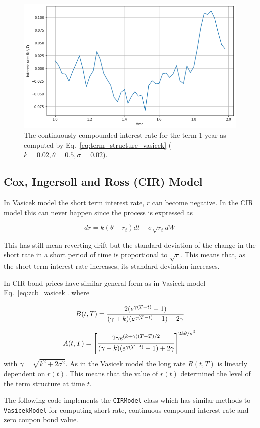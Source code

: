 \begin{figure}[htb]
	\centering
	\includegraphics[width=0.7\linewidth]{figures/vasicek_interest_rate}
	\caption{The continuously compounded interest rate for the term 1 year as computed by Eq.~\ref{eq:term_structure_vasicek} ($k=0.02, \theta=0.5, \sigma=0.02$).}
	\label{fig:term_structure_vasicek}
\end{figure}

\subsection{Cox, Ingersoll and Ross (CIR) Model}
\label{cox-ingersoll-and-ross-cir-model}

In Vasicek model the short term interest rate, \(r\) can become
negative. In the CIR model this can never happen since the process is
expressed as

\[dr = k(\theta - r_t)dt + \sigma\sqrt{r_t}dW\]

This has still mean reverting drift but the standard deviation of the
change in the short rate in a short period of time is proportional to
\(\sqrt{r}\). This means that, as the short-term interest rate
increases, its standard deviation increases.

In CIR bond prices have similar general form as in Vasicek model
Eq.~\ref{eq:zcb_vasicek}. where

\[B(t, T) = \cfrac{2(e^{\gamma(T-t)}-1)}{(\gamma+k)(e^{\gamma(T-t)}-1)+2\gamma}\]

\[A(t, T) = \left[\cfrac{2\gamma e^{(k+\gamma)(T-T)/2}}{(\gamma+k)(e^{\gamma(T-t)}-1)+2\gamma}\right]^{2k\theta /\sigma^2}\]
with \(\gamma = \sqrt {k^2 + 2\sigma^2}\). As in the Vasicek model the
long rate \(R(t, T)\) is linearly dependent on \(r(t)\). This means that
the value of \(r(t)\) determined the level of the term structure at time
\(t\).

The following code implements the \texttt{CIRModel} class which 
has similar methods to \texttt{VasicekModel} for computing short rate,
continuous compound interest rate and zero coupon bond value.











